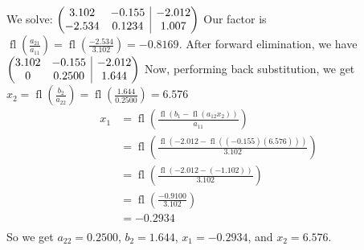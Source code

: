 \documentclass[11pt]{article}
\makeatletter
\DeclareMathOperator{\fl}{fl}
\newenvironment{amatrix}[1]{%
  \left(\begin{array}{@{}*{#1}{c}|c@{}}
}{%
  \end{array}\right)
}
\makeatother
\begin{document}
\subsection{} %
We solve:
$\begin{amatrix}{2}
	3.102 & -0.155 & -2.012\\
	-2.534 & 0.1234 & 1.007\\
\end{amatrix}$
\newline
\newline
Our factor is
$\fl\left(\frac{a_{21}}{a_{11}}\right)=\fl\left(\frac{-2.534}{3.102}\right)
=-0.8169$. After forward elimination, we have
$\begin{amatrix}{2}
	3.102 & -0.155 & -2.012\\
	0 & 0.2500 & 1.644\\
\end{amatrix}$
\newline
\newline
Now, performing back substitution, we get
$x_2=\fl\left(\frac{b_2}{a_{22}}\right)=\fl\left(\frac{1.644}{0.2500}\right)=6.576$
\begin{align*}
	x_1&=\fl\left(\frac{\fl\left(b_1-\fl\left(a_{12}x_2\right)\right)}{a_{11}}\right)\\
	&=\fl\left(\frac{\fl\left(-2.012-\fl\left((-0.155)(6.576)\right)\right)}{3.102}\right)\\
	&=\fl\left(\frac{\fl\left(-2.012-\left(-1.102\right)\right)}{3.102}\right)\\
	&=\fl\left(\frac{-0.9100}{3.102}\right)\\
	&=-0.2934\\
\end{align*}
So we get $a_{22}=0.2500$, $b_2=1.644$, $x_1=-0.2934$, and $x_2=6.576$.


\subsection{} %

\end{document}
